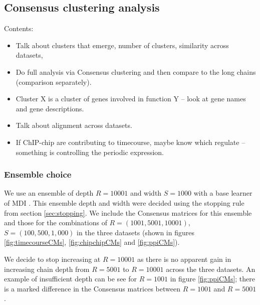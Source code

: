 \documentclass[]{article}
\begin{document}
\subsection{Consensus clustering analysis} \label{sec:consensusClustering}

Contents:
\begin{itemize}
	\item Talk about clusters that emerge, number of clusters, similarity across datasets,
	\item Do full analysis via Consensus clustering and then compare to the long chains (comparison separately).
	\item Cluster X is a cluster of genes involved in function Y – look at gene names and gene descriptions.
	\item Talk about alignment across datasets.
	\item If ChIP-chip are contributing to timecourse, maybe know which regulate – something is controlling the periodic expression.
\end{itemize}

\subsubsection{Ensemble choice}
We use an ensemble of depth $R=10001$ and width $S=1000$ with a base learner of MDI \citep[using the implementation from][]{mason2016mdi}. This ensemble depth and width were decided using the stopping rule from section \ref{sec:stopping}. We include the Consensus matrices for this ensemble and those for the combinations of $R = (1001, 5001, 10001)$, $S=(100, 500, 1,000)$ in the three datasets (shown in figures \ref{fig:timecourseCMs}, \ref{fig:chipchipCMs} and \ref{fig:ppiCMs}).


We decide to stop increasing at $R=10001$ as there is no apparent gain in increasing chain depth from $R=5001$ to $R=10001$ across the three datasets. An example of insufficient depth can be see for $R=1001$ in figure \ref{fig:ppiCMs}; there is a marked difference in the Consensus matrices between $R=1001$ and $R=5001$. 
\end{document}
